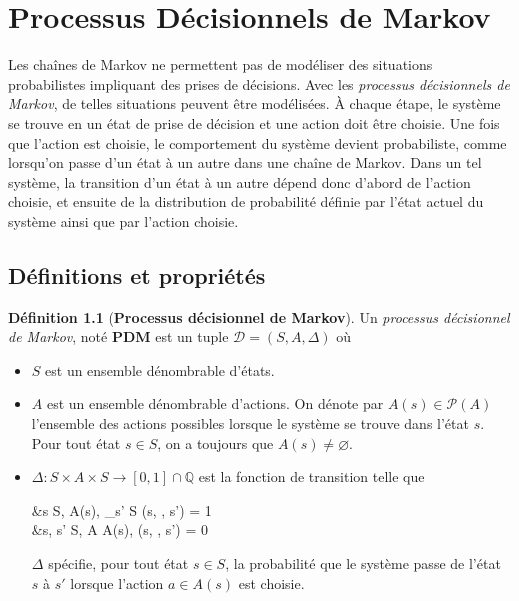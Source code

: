 \documentclass[12pt,a4paper]{report}
\theoremstyle{definition}%
\newtheorem{definition}{Définition}[chapter]
\theoremstyle{remark}
\let\labelitemi\labelitemii
\begin{document}
\chapter{Processus Décisionnels de Markov}

Les chaînes de Markov ne permettent pas de modéliser des situations probabilistes impliquant des prises de décisions. Avec les \textit{processus décisionnels de Markov}, de telles situations peuvent être modélisées. \`A chaque étape, le système se trouve en un état de prise de décision et une action doit être choisie. Une fois que l'action est choisie, le comportement du système devient probabiliste, comme lorsqu'on passe d'un état à un autre dans une chaîne de Markov. Dans un tel système, la transition d'un état à un autre dépend donc d'abord de l'action choisie, et ensuite de la distribution de probabilité définie par l'état actuel du système ainsi que par l'action choisie.

\section{Définitions et propriétés}

\begin{definition}[\textbf{Processus décisionnel de Markov}]
	Un \textit{processus décisionnel de Markov}, noté \textbf{PDM} est un tuple $\mathcal{D}  = (S, A, \Delta)$ où
	\begin{itemize}
		\renewcommand{\labelitemi}{\tiny $\bullet$}
		\item $S$ est un ensemble dénombrable d'états.
		\item $A$ est un ensemble dénombrable d'actions. On dénote par $A(s) \in \mathcal{P}(A)$  l'ensemble des actions possibles lorsque le système se trouve dans l'état $s$. Pour tout état $s \in S$, on a toujours que $A(s) \neq \varnothing$.
		\item $\Delta: S \times A \times S \rightarrow [0, 1] \cap \mathbb{Q}$ est la fonction de transition telle que
		\begin{flalign*}
			&\forall s \in S, \; \forall \alpha \in A(s), \; \sum_{s' \in S} \Delta(s, \alpha, s') = 1 \\
			 &\forall s, s' \in S, \; \forall \alpha \in A \setminus A(s), \; \Delta(s, \alpha, s') = 0
		\end{flalign*}

			$\Delta$ spécifie, pour tout état $s \in S$, la probabilité que le système passe de l'état $s$ à $s'$ lorsque l'action $a \in A(s)$ est choisie.
	\end{itemize}
\end{definition}
\end{document}

